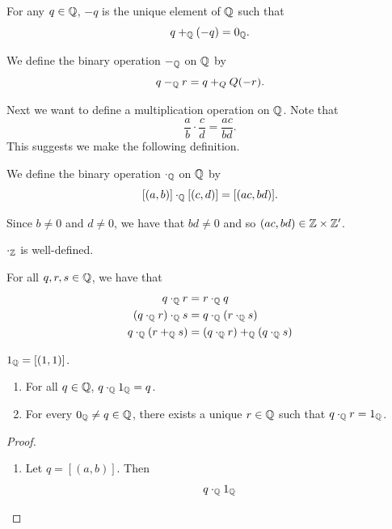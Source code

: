 \begin{definition}
For any $q\in\mathbb Q$, $-q$ is the unique element of $\mathbb Q$ such that
\[q+_\mathbb Q(-q)=0_\mathbb Q.\]
\end{definition}

\begin{definition}
We define the binary operation $-_\mathbb Q$ on $\mathbb Q$ by
\[q-_\mathbb Q r=q+_QQ(-r).\]
\end{definition}

Next we want to define a multiplication operation on $\mathbb Q$. Note that
\[\frac{a}{b}\cdot\frac{c}{d}=\frac{ac}{bd}.\]
This suggests we make the following definition.

\begin{definition}
We define the binary operation $\cdot_\mathbb Q$ on $\mathbb Q$ by
\[[(a,b)]\cdot_\mathbb Q[(c,d)]=[(ac,bd)].\]
\end{definition}

\begin{remark}
Since $b\neq0$ and $d\neq0$, we have that $bd\neq0$ and so $(ac,bd)\in\mathbb Z\times\mathbb Z^\prime$.
\end{remark}

\begin{lemma}
$\cdot_\mathbb Z$ is well-defined.
\end{lemma}

\begin{theorem}
For all $q,r,s\in\mathbb Q$, we have that
\begin{align*}
q\cdot_\mathbb Q r&=r\cdot_\mathbb Q q\\
(q\cdot_\mathbb Q r)\cdot_\mathbb Q s&=q\cdot_\mathbb Q(r\cdot_\mathbb Q s)\\
q\cdot_\mathbb Q(r+_\mathbb Q s)&=(q\cdot_\mathbb Q r)+_\mathbb Q(q\cdot_\mathbb Q s)
\end{align*}
\end{theorem}

\begin{definition}
$1_\mathbb Q=[(1,1)]$.
\end{definition}

\begin{theorem}
\begin{enumerate}[label=(\arabic*)]
\item For all $q\in\mathbb Q$, $q\cdot_\mathbb Q1_\mathbb Q=q$.
\item For every $0_\mathbb Q\neq q\in\mathbb Q$, there exists a unique $r\in\mathbb Q$ such that $q\cdot_\mathbb Q r=1_\mathbb Q$.
\end{enumerate}
\end{theorem}

\begin{proof} \
\begin{enumerate}[label=(\arabic*)]
\item Let $q=[(a,b)]$. Then
\begin{align*}
q\cdot_\mathbb Q1_\mathbb Q
\end{align*}
\end{enumerate}
\end{proof}



